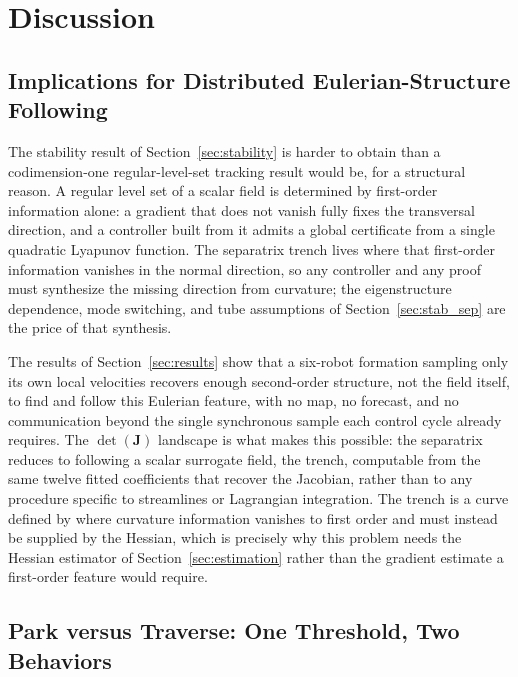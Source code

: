 \documentclass[lettersize,journal]{IEEEtran}
\begin{document}
\section{Discussion}
\label{sec:discussion}

\subsection{Implications for Distributed Eulerian-Structure Following}

The stability result of Section~\ref{sec:stability} is harder to obtain
than a codimension-one regular-level-set tracking result would be,
for a structural reason. A regular level set of a scalar field is
determined by first-order information alone: a gradient that does not
vanish fully fixes the transversal direction, and a controller built
from it admits a global certificate from a single quadratic Lyapunov
function. The separatrix trench lives where that first-order
information vanishes in the normal direction, so any controller and any
proof must synthesize the missing direction from curvature; the
eigenstructure dependence, mode switching, and tube assumptions of
Section~\ref{sec:stab_sep} are the price of that synthesis.

The results of Section~\ref{sec:results} show that a six-robot formation
sampling only its own local velocities recovers enough second-order
structure, not the field itself, to find and follow this Eulerian
feature, with no map, no forecast, and no communication beyond the
single synchronous sample each control cycle already requires. The
$\det(\mathbf{J})$ landscape is what makes this possible: the separatrix
reduces to following a scalar surrogate field, the trench, computable
from the same twelve fitted coefficients that recover the Jacobian,
rather than to any procedure specific to streamlines or Lagrangian
integration. The trench is a curve defined by where curvature
information vanishes to first order and must instead be supplied by
the Hessian, which is precisely why this problem needs the Hessian
estimator of Section~\ref{sec:estimation} rather than the gradient
estimate a first-order feature would require.

\subsection{Park versus Traverse: One Threshold, Two Behaviors}
\label{sec:park_vs_traverse}
\end{document}
